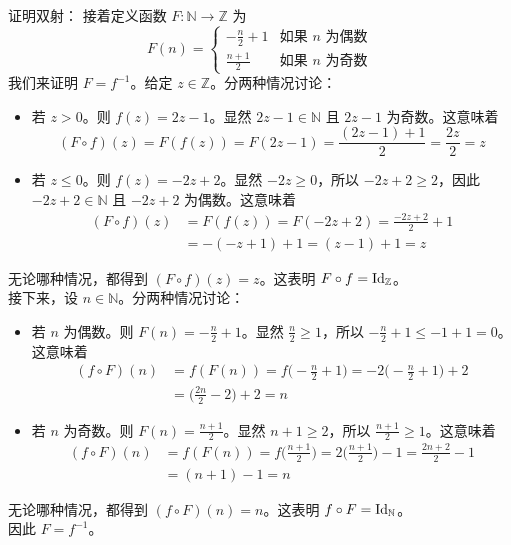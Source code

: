 \begin{example}
\begin{proofs}{证明双射：}
        接着定义函数 $F : \mathbb{N} \to \mathbb{Z}$ 为
        \[F(n) = \begin{cases}
                -\frac{n}{2} + 1 & \text{如果\ } n \text{\ 为偶数} \\
                \frac{n+1}{2}    & \text{如果\ } n \text{\ 为奇数}
            \end{cases}\]
        我们来证明 $F=f^{-1}$。给定 $z \in \mathbb{Z}$。分两种情况讨论：
        \begin{itemize}
            \item 若 $z > 0$。则 $f(z)=2z-1$。显然 $2z-1 \in \mathbb{N}$ 且 $2z-1$ 为奇数。这意味着
                  \[(F \circ f)(z) = F(f(z)) = F(2z - 1) = \frac{(2z-1)+1}{2} = \frac{2z}{2} = z\]
            \item 若 $z \le 0$。则 $f(z)=-2z+2$。显然 $-2z \ge 0$，所以 $-2z + 2 \ge 2$，因此 $-2z + 2 \in \mathbb{N}$ 且 $-2z + 2$ 为偶数。这意味着
                  \begin{align*}
                      (F \circ f)(z) & = F(f(z)) = F(-2z + 2) = \frac{-2z + 2}{2}+1 \\
                                     & = -(-z + 1) + 1 = (z - 1) + 1 = z
                  \end{align*}
        \end{itemize}
        无论哪种情况，都得到 $(F \circ f)(z) = z$。这表明 $F \circ f = \text{Id}_{\mathbb{Z}}$。\\

        接下来，设 $n \in \mathbb{N}$。分两种情况讨论：
        \begin{itemize}
            \item 若 $n$ 为偶数。则 $F(n) = -\frac{n}{2} + 1$。显然 $\frac{n}{2} \ge 1$，所以 $-\frac{n}{2} + 1 \le -1+1=0$。这意味着
                  \begin{align*}
                      (f \circ F)(n) & = f(F(n)) = f\Big(-\frac{n}{2}+1\Big) = -2\Big(-\frac{n}{2}+1\Big)+2 \\
                                     & = \Big(\frac{2n}{2}-2\Big)+2=n
                  \end{align*}
            \item 若 $n$ 为奇数。则 $F(n) = \frac{n+1}{2}$。显然 $n+1 \ge 2$，所以 $\frac{n+1}{2} \ge 1$。这意味着
                  \begin{align*}
                      (f \circ F)(n) & = f(F(n)) = f\Big(\frac{n+1}{2}\Big) = 2(\frac{n+1}{2}\Big)-1 = \frac{2n+2}{2}-1 \\
                                     & = (n + 1) -1 = n
                  \end{align*}
        \end{itemize}
        无论哪种情况，都得到 $(f \circ F)(n) = n$。这表明 $f \circ F = \text{Id}_{\mathbb{N}}$。\\

        因此 $F = f^{-1}$。
    \end{proofs}
\end{example}

